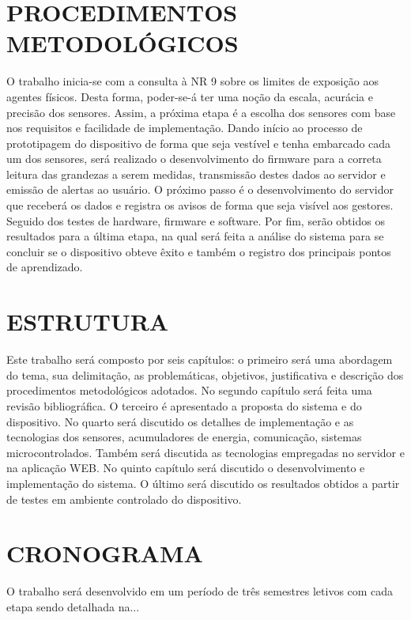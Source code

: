 \section{PROCEDIMENTOS METODOLÓGICOS}
\label{sec: procedimentosMetodologicos}

O trabalho inicia-se com a consulta à NR 9 sobre os limites de exposição aos agentes físicos. Desta forma, poder-se-á ter uma noção da escala, acurácia e precisão dos sensores. Assim, a próxima etapa é a escolha dos sensores com base nos requisitos e facilidade de implementação.
Dando início ao processo de prototipagem do dispositivo de forma que seja vestível e tenha embarcado cada um dos sensores, será realizado o desenvolvimento do firmware para a correta leitura das grandezas a serem medidas, transmissão destes dados ao servidor e emissão de alertas ao usuário.
O próximo passo é o desenvolvimento do servidor que receberá os dados e registra os avisos de forma que seja visível aos gestores. Seguido dos testes de hardware, firmware e software. 
Por fim, serão obtidos os resultados para a última etapa, na qual será feita a análise do sistema para se concluir se o dispositivo obteve êxito e também o registro dos principais pontos de aprendizado.


\section{ESTRUTURA}
\label{sec: estrutura}

Este trabalho será composto por seis capítulos: o primeiro será uma abordagem do tema, sua delimitação, as problemáticas, objetivos, justificativa e descrição dos procedimentos metodológicos adotados. No segundo capítulo será feita uma revisão bibliográfica. O terceiro é apresentado a proposta do sistema e do dispositivo. No quarto será discutido os detalhes de implementação e as tecnologias dos sensores, acumuladores de energia, comunicação, sistemas microcontrolados. Também será discutida as tecnologias empregadas no servidor e na aplicação WEB. No quinto capítulo será discutido o desenvolvimento e implementação do sistema. O último será discutido os resultados obtidos a partir de testes em ambiente controlado do dispositivo. 

\section{CRONOGRAMA}
\label{sec: cronograma}

O trabalho será desenvolvido em um período de três semestres letivos com cada etapa sendo detalhada na...

